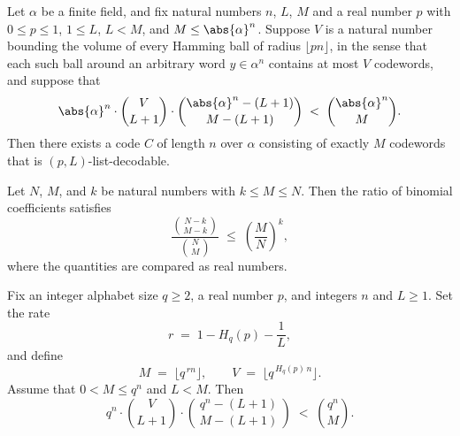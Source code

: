\begin{lemma}
\label{ErrorCorrectingCodes.Codeword.exists_listDecodable_code}
\leanok
{}
Let $\alpha$ be a finite field, and fix natural numbers $n$, $L$, $M$ and a real number
$p$ with $0 \le p \le 1$, $1 \le L$, $L < M$, and $M \le \abs{\alpha}^n$. Suppose $V$ is
a natural number bounding the volume of every Hamming ball of radius $\lfloor
pn\rfloor$, in the sense that each such ball around an arbitrary word $y \in \alpha^n$
contains at most $V$ codewords, and suppose that
\[
\abs{\alpha}^n \cdot \binom{V}{L+1} \cdot \binom{\abs{\alpha}^n - (L+1)}{\,M-(L+1)\,}
\;<\; \binom{\abs{\alpha}^n}{M}.
\]
Then there exists a code $C$ of length $n$ over $\alpha$ consisting of exactly $M$
codewords that is $(p,L)$-list-decodable.
\end{lemma}

\begin{lemma}
\label{ErrorCorrectingCodes.Codeword.binom_ratio_bound}
\leanok
{}
Let $N$, $M$, and $k$ be natural numbers with $k \le M \le N$. Then the ratio of
binomial coefficients satisfies
\[
\frac{\binom{N-k}{M-k}}{\binom{N}{M}} \;\le\; \left(\frac{M}{N}\right)^{k},
\]
where the quantities are compared as real numbers.
\end{lemma}

\begin{lemma}
\label{ErrorCorrectingCodes.Codeword.listDecoding_counting_ineq}
\leanok
{}
Fix an integer alphabet size $q \ge 2$, a real number $p$, and integers $n$ and $L \ge
1$. Set the rate
\[
r \;=\; 1 - H_q(p) - \frac{1}{L},
\]
and define
\[
M \;=\; \bigl\lfloor q^{\,r n} \bigr\rfloor,
\qquad
V \;=\; \bigl\lfloor q^{\,H_q(p)\, n} \bigr\rfloor .
\]
Assume that $0 < M \le q^n$ and $L < M$. Then
\[
q^n \cdot \binom{V}{L+1} \cdot \binom{q^n - (L+1)}{\,M - (L+1)\,}
\;<\;
\binom{q^n}{M}.
\]
\end{lemma}

